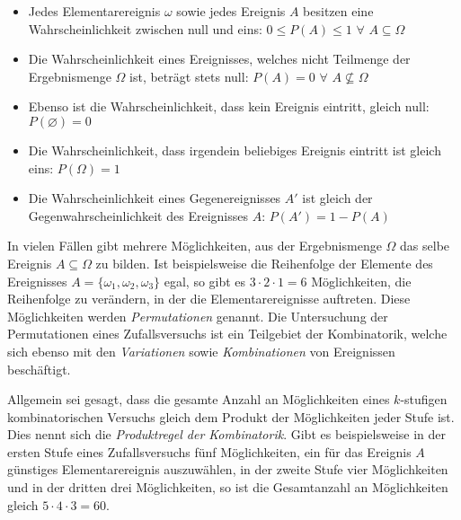 \begin{itemize}
	\item Jedes Elementarereignis $\omega$ sowie jedes Ereignis $A$ besitzen eine Wahrscheinlichkeit zwischen null und eins: $0 \leq P(A) \leq 1 \,\,\forall\,\, A \subseteq \Omega$

	\item Die Wahrscheinlichkeit eines Ereignisses, welches nicht Teilmenge der Ergebnismenge $\Omega$ ist, betr\"{a}gt stets null: $P(A) = 0 \,\,\forall\,\, A \nsubseteq \Omega$

	\item Ebenso ist die Wahrscheinlichkeit, dass kein Ereignis eintritt, gleich null: $P(\varnothing) = 0$

	\item Die Wahrscheinlichkeit, dass irgendein beliebiges Ereignis eintritt ist gleich eins: $P(\Omega) = 1$

	\item Die Wahrscheinlichkeit eines Gegenereignisses $A'$ ist gleich der Gegenwahrscheinlichkeit des Ereignisses $A$: $P(A') = 1 - P(A)$
\end{itemize}


In vielen F\"{a}llen gibt mehrere M\"{o}glichkeiten, aus der Ergebnismenge $\Omega$ das selbe Ereignis $A \subseteq \Omega$ zu bilden. Ist beispielsweise die Reihenfolge der Elemente des Ereignisses $A = \{\omega_1, \omega_2, \omega_3\}$ egal, so gibt es $3 \cdot 2 \cdot 1 = 6$ M\"{o}glichkeiten, die Reihenfolge zu ver\"{a}ndern, in der die Elementarereignisse auftreten. Diese M\"{o}glichkeiten werden \emph{Permutationen} genannt. Die Untersuchung der Permutationen eines Zufallsversuchs ist ein Teilgebiet der Kombinatorik, welche sich ebenso mit den \emph{Variationen} sowie \emph{Kombinationen} von Ereignissen besch\"{a}ftigt.

Allgemein sei gesagt, dass die gesamte Anzahl an M\"{o}glichkeiten eines $k$-stufigen kombinatorischen Versuchs gleich dem Produkt der M\"{o}glichkeiten jeder Stufe ist. Dies nennt sich die \emph{Produktregel der Kombinatorik}. Gibt es beispielsweise in der ersten Stufe eines Zufallsversuchs f\"{u}nf M\"{o}glichkeiten, ein f\"{u}r das Ereignis $A$ g\"{u}nstiges Elementarereignis auszuw\"{a}hlen, in der zweite Stufe vier M\"{o}glichkeiten und in der dritten drei M\"{o}glichkeiten, so ist die Gesamtanzahl an M\"{o}glichkeiten gleich $5 \cdot 4 \cdot 3 = 60$.


